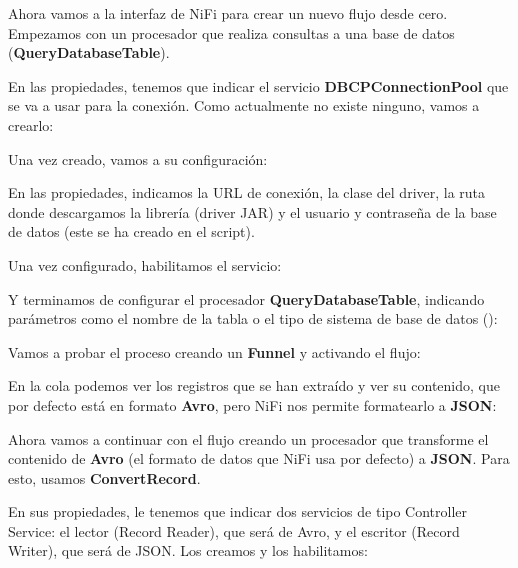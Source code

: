 \documentclass{../../../miPlantilla}
\begin{document}
Ahora vamos a la interfaz de NiFi para crear un nuevo flujo desde cero. Empezamos con un procesador que realiza consultas a una base de datos (\textbf{QueryDatabaseTable}).


\newpage

En las propiedades, tenemos que indicar el servicio \textbf{DBCPConnectionPool} que se va a usar para la conexión. Como actualmente no existe ninguno, vamos a crearlo:


Una vez creado, vamos a su configuración:


En las propiedades, indicamos la URL de conexión, la clase del driver, la ruta donde descargamos la librería (driver JAR) y el usuario y contraseña de la base de datos (este se ha creado en el script).


Una vez configurado, habilitamos el servicio:


Y terminamos de configurar el procesador \textbf{QueryDatabaseTable}, indicando parámetros como el nombre de la tabla o el tipo de sistema de base de datos ():


\newpage

Vamos a probar el proceso creando un \textbf{Funnel} y activando el flujo:


En la cola podemos ver los registros que se han extraído y ver su contenido, que por defecto está en formato \textbf{Avro}, pero NiFi nos permite formatearlo a \textbf{JSON}:


\newpage

Ahora vamos a continuar con el flujo creando un procesador que transforme el contenido de \textbf{Avro} (el formato de datos que NiFi usa por defecto) a \textbf{JSON}. Para esto, usamos \textbf{ConvertRecord}.


En sus propiedades, le tenemos que indicar dos servicios de tipo Controller Service: el lector (Record Reader), que será de Avro, y el escritor (Record Writer), que será de JSON. Los creamos y los habilitamos:
\end{document}
